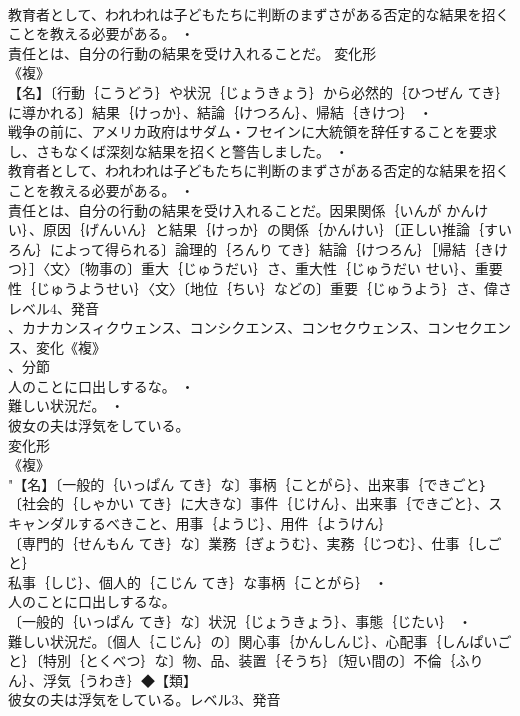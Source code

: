 \documentclass[8pt]{extreport}
\begin{document}
\begin{CJK}{UTF8}{min}
\\	教育者として、われわれは子どもたちに判断のまずさがある否定的な結果を招くことを教える必要がある。 ・
\\	責任とは、自分の行動の結果を受け入れることだ。	変化形 
\\	《複》
\\	【名】〔行動｛こうどう｝や状況｛じょうきょう｝から必然的｛ひつぜん てき｝に導かれる〕結果｛けっか｝、結論｛けつろん｝、帰結｛きけつ｝ ・
\\	戦争の前に、アメリカ政府はサダム・フセインに大統領を辞任することを要求し、さもなくば深刻な結果を招くと警告しました。 ・
\\	教育者として、われわれは子どもたちに判断のまずさがある否定的な結果を招くことを教える必要がある。 ・
\\	責任とは、自分の行動の結果を受け入れることだ。因果関係｛いんが かんけい｝、原因｛げんいん｝と結果｛けっか｝の関係｛かんけい｝〔正しい推論｛すいろん｝によって得られる〕論理的｛ろんり てき｝結論｛けつろん｝［帰結｛きけつ｝］〈文〉〔物事の〕重大｛じゅうだい｝さ、重大性｛じゅうだい せい｝、重要性｛じゅうようせい｝〈文〉〔地位｛ちい｝などの〕重要｛じゅうよう｝さ、偉さレベル4、発音
\\	、カナカンスィクウェンス、コンシクエンス、コンセクウェンス、コンセクエンス、変化《複》
\\	、分節
\\	人のことに口出しするな。 ・
\\	難しい状況だ。 ・
\\	彼女の夫は浮気をしている。
\\	変化形 
\\	《複》
\\	"【名】〔一般的｛いっぱん てき｝な〕事柄｛ことがら｝、出来事｛できごと｝〔社会的｛しゃかい てき｝に大きな〕事件｛じけん｝、出来事｛できごと｝、スキャンダルするべきこと、用事｛ようじ｝、用件｛ようけん｝
\\	〔専門的｛せんもん てき｝な〕業務｛ぎょうむ｝、実務｛じつむ｝、仕事｛しごと｝
\\	私事｛しじ｝、個人的｛こじん てき｝な事柄｛ことがら｝ ・
\\	人のことに口出しするな。
\\	〔一般的｛いっぱん てき｝な〕状況｛じょうきょう｝、事態｛じたい｝ ・
\\	難しい状況だ。〔個人｛こじん｝の〕関心事｛かんしんじ｝、心配事｛しんぱいごと｝〔特別｛とくべつ｝な〕物、品、装置｛そうち｝〔短い間の〕不倫｛ふりん｝、浮気｛うわき｝◆【類】
\\	彼女の夫は浮気をしている。レベル3、発音

\end{CJK}
\end{document}

